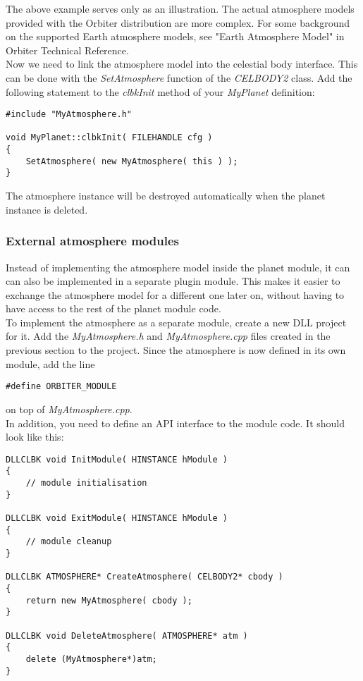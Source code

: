 \documentclass[Orbiter Developer Manual.tex]{subfiles}
\begin{document}
\noindent
The above example serves only as an illustration. The actual atmosphere models provided with the Orbiter distribution are more complex. For some background on the supported Earth atmosphere models, see "Earth Atmosphere Model" in Orbiter Technical Reference.\\
Now we need to link the atmosphere model into the celestial body interface. This can be done with the \textit{SetAtmosphere} function of the \textit{CELBODY2} class. Add the following statement to the \textit{clbkInit} method of your \textit{MyPlanet} definition:

\begin{lstlisting}
#include "MyAtmosphere.h"

void MyPlanet::clbkInit( FILEHANDLE cfg )
{
	SetAtmosphere( new MyAtmosphere( this ) );
}
\end{lstlisting}

\noindent
The atmosphere instance will be destroyed automatically when the planet instance is deleted.


\subsubsection{External atmosphere modules}
Instead of implementing the atmosphere model inside the planet module, it can can also be implemented in a separate plugin module. This makes it easier to exchange the atmosphere model for a different one later on, without having to have access to the rest of the planet module code.\\
To implement the atmosphere as a separate module, create a new DLL project for it. Add the \textit{MyAtmosphere.h} and \textit{MyAtmosphere.cpp} files created in the previous section to the project. Since the atmosphere is now defined in its own module, add the line

\begin{lstlisting}
#define ORBITER_MODULE

\end{lstlisting}

\noindent
on top of \textit{MyAtmosphere.cpp}.\\
In addition, you need to define an API interface to the module code. It should look like this:

\begin{lstlisting}
DLLCLBK void InitModule( HINSTANCE hModule )
{
	// module initialisation
}

DLLCLBK void ExitModule( HINSTANCE hModule )
{
	// module cleanup
}

DLLCLBK ATMOSPHERE* CreateAtmosphere( CELBODY2* cbody )
{
	return new MyAtmosphere( cbody );
}

DLLCLBK void DeleteAtmosphere( ATMOSPHERE* atm )
{
	delete (MyAtmosphere*)atm;
}
\end{lstlisting}
\end{document}
